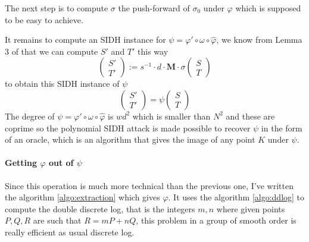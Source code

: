 \documentclass[12pt,a4paper]{article}
\begin{document}

				The next step is to compute $\sigma$ the push-forward of $\sigma_0$ under $\varphi$ which
				is supposed to be easy to achieve.

				It remains to compute an SIDH instance for $\psi=\varphi'\circ\omega\circ\widehat\varphi$, we
				know from Lemma 3 of \cite{polyCIST} that we can compute $S'$ and $T'$ this way \[
					\begin{pmatrix} S' \\ T' \end{pmatrix} := s^{-1}\cdot d\cdot\mathbf M\cdot\sigma\begin{pmatrix} S \\ T \end{pmatrix} 
					\] to obtain this SIDH instance of $\psi$ \[
					\begin{pmatrix} S' \\ T' \end{pmatrix} = \psi\begin{pmatrix} S \\ T \end{pmatrix} 
				\]
				The degree of $\psi=\varphi'\circ\omega\circ\widehat\varphi$ is $wd^2$ which is smaller than
				$N^2$ and these are coprime so the polynomial SIDH attack is made possible to recover $\psi$ in
				the form of an oracle, which is an algorithm that gives the image of any point $K$ under $\psi$.


				\paragraph{Getting $\varphi$ out of $\psi$}
				Since this operation is much more technical than the previous one, I've written the algorithm
			\ref{algo:extraction} which gives $\varphi$. It uses the algorithm \ref{algo:ddlog} to compute
			the double discrete log, that is the integers $m,n$ where given points $P,Q,R$ are such that
			$R=mP+nQ$, this problem in a group of smooth order is really efficient as usual discrete log.
\end{document}
